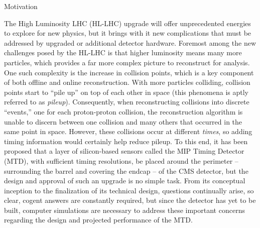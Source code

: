 %
%

\begin{section}{Motivation}

The High Luminosity LHC (HL-LHC) upgrade will offer unprecedented energies to explore for new physics, but it brings with it new complications that must be addressed by upgraded or additional detector hardware. Foremost among the new challenges posed by the HL-LHC is that higher luminosity means many more particles, which provides a far more complex picture to reconstruct for analysis. One such complexity is the increase in collision points, which is a key component of both offline and online reconstruction. With more particles colliding, collision points start to ``pile up'' on top of each other in space (this phenomena is aptly referred to as \textit{pileup}). Consequently, when reconstructing collisions into discrete ``events,'' one for each proton-proton collision, the reconstruction algorithm is unable to discern between one collision and many others that occurred in the same point in space. However, these collisions occur at different \textit{times}, so adding timing information would certainly help reduce pileup. To this end, it has been proposed that a layer of silicon-based sensors called the MIP Timing Detector (MTD), with sufficient timing resolutions, be placed around the perimeter -- surrounding the barrel and covering the endcap -- of the CMS detector, but the design and approval of such an upgrade is no simple task. From its conceptual inception to the finalization of its technical design, questions continually arise, so clear, cogent answers are constantly required, but since the detector has yet to be built, computer simulations are necessary to address these important concerns regarding the design and projected performance of the MTD.

\end{section}

